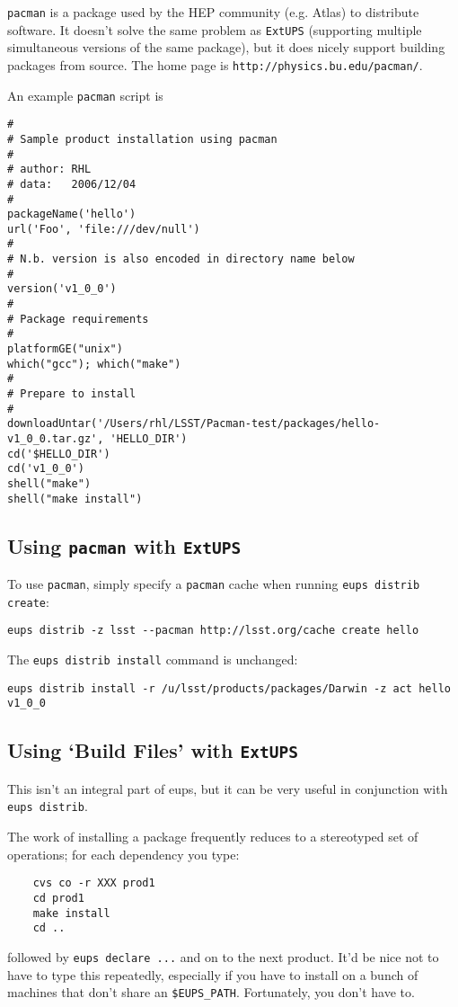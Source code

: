 \documentclass{article}
\newcommand{\code}[1]{\texttt{#1}}
\newcommand{\eups}{\code{ExtUPS}}
\newcommand{\pacman}{\code{pacman}}
\begin{document}
\pacman{} is a package used by the HEP community (e.g. Atlas) to distribute
software.  It doesn't solve the same problem as \eups{} (supporting 
multiple simultaneous versions of the same package), but it does nicely
support building packages from source.  The home page is \code{http://physics.bu.edu/pacman/}.

An example \pacman{} script is
\begin{verbatim}
#
# Sample product installation using pacman
#
# author: RHL
# data:   2006/12/04
#
packageName('hello')
url('Foo', 'file:///dev/null')
#
# N.b. version is also encoded in directory name below
#
version('v1_0_0')
#
# Package requirements
#
platformGE("unix")
which("gcc"); which("make")
#
# Prepare to install
#
downloadUntar('/Users/rhl/LSST/Pacman-test/packages/hello-v1_0_0.tar.gz', 'HELLO_DIR')
cd('$HELLO_DIR')
cd('v1_0_0')
shell("make")
shell("make install")
\end{verbatim}				%

\subsection{Using \pacman{} with \eups{}}

To use \pacman{}, simply specify a \pacman{} cache when running \code{eups distrib create}:
\begin{verbatim}
eups distrib -z lsst --pacman http://lsst.org/cache create hello
\end{verbatim}

The \code{eups distrib install} command is unchanged:
\begin{verbatim}
eups distrib install -r /u/lsst/products/packages/Darwin -z act hello v1_0_0
\end{verbatim}

\subsection{Using `Build Files' with \eups{}}
\label{buildFiles}

This isn't an integral part of eups, but it can be very useful in conjunction with \code{eups distrib}.

The work of installing a package frequently reduces to a stereotyped set of operations;
for each dependency you type:
\begin{verbatim}
    cvs co -r XXX prod1
    cd prod1
    make install
    cd ..
\end{verbatim}
followed by \code{eups declare ...} and on to the next product.  It'd
be nice not to have to type this repeatedly, especially if you have to
install on a bunch of machines that don't share an
\code{\$EUPS\_PATH}.  Fortunately, you don't have to.
\end{document}

